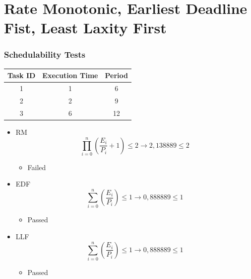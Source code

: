 \documentclass[xcolor=table]{beamer}
\begin{document}
\section{Rate Monotonic, Earliest Deadline Fist, Least Laxity First}
\begin{frame}
\frametitle{Schedulability Tests}
\begin{table}[]
\begin{tabular}{|c|c|c|}
\hline
\textbf{Task ID} & \textbf{Execution Time} & \textbf{Period}\\ \hline
\cellcolor[HTML]{ECF6CE}1 &\cellcolor[HTML]{ECF6CE}1 &\cellcolor[HTML]{ECF6CE}6 \\ \hline
\cellcolor[HTML]{A4A4A4}2 &\cellcolor[HTML]{A4A4A4}2 &\cellcolor[HTML]{A4A4A4}9 \\ \hline
\cellcolor[HTML]{F781D8}3 &\cellcolor[HTML]{F781D8}6 &\cellcolor[HTML]{F781D8}12 \\ \hline
\end{tabular}
\end{table}
\end{frame}
\begin{frame}
\begin{itemize}
\item RM
\begin{equation}
\prod_{i=0}^{n} \left( \frac{E_i}{P_i}+1 \right) \leq 2 \rightarrow2,138889 \leq 2
\end{equation}
\begin{itemize}
\item Failed\end{itemize}
\item EDF
\begin{equation}
\sum_{i=0}^{n} \left( \frac{E_i}{P_i} \right) \leq 1 \rightarrow0,888889 \leq 1
\end{equation}
\begin{itemize}
\item Passed\end{itemize}
\item LLF
\begin{equation}
\sum_{i=0}^{n} \left( \frac{E_i}{P_i} \right) \leq 1 \rightarrow0,888889 \leq 1
\end{equation}
\begin{itemize}
\item Passed\end{itemize}
\end{itemize}
\end{frame}
\end{document}
